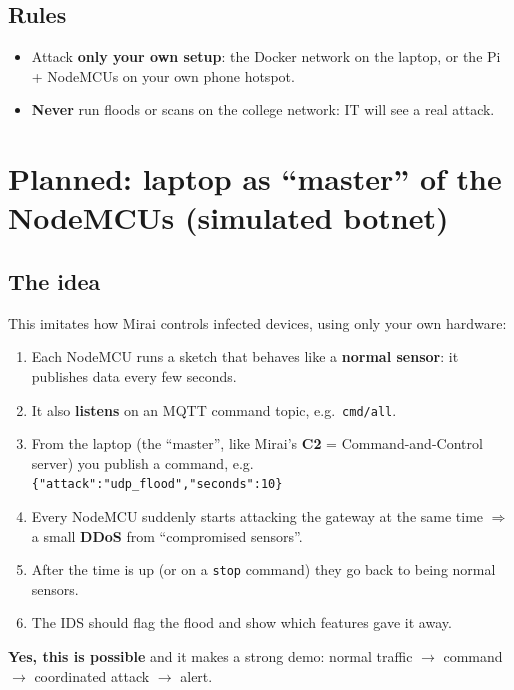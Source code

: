 \documentclass[11pt]{article}
\begin{document}
\subsection*{Rules}
\begin{itemize}
\item Attack \textbf{only your own setup}: the Docker network on the laptop, or the Pi + NodeMCUs on your own phone hotspot.
\item \textbf{Never} run floods or scans on the college network: IT will see a real attack.
\end{itemize}

\newpage
\section{Planned: laptop as ``master'' of the NodeMCUs (simulated botnet)}

\subsection*{The idea}
This imitates how Mirai controls infected devices, using only your own hardware:
\begin{enumerate}
\item Each NodeMCU runs a sketch that behaves like a \textbf{normal sensor}: it publishes data every few seconds.
\item It also \textbf{listens} on an MQTT command topic, e.g.\ \texttt{cmd/all}.
\item From the laptop (the ``master'', like Mirai's \textbf{C2} = Command-and-Control server) you publish a command, e.g.\\
\texttt{\{"attack":"udp\_flood","seconds":10\}}
\item Every NodeMCU suddenly starts attacking the gateway at the same time $\Rightarrow$ a small \textbf{DDoS} from ``compromised sensors''.
\item After the time is up (or on a \texttt{stop} command) they go back to being normal sensors.
\item The IDS should flag the flood and show which features gave it away.
\end{enumerate}
\textbf{Yes, this is possible} and it makes a strong demo: normal traffic $\rightarrow$ command $\rightarrow$ coordinated attack $\rightarrow$ alert.
\end{document}
